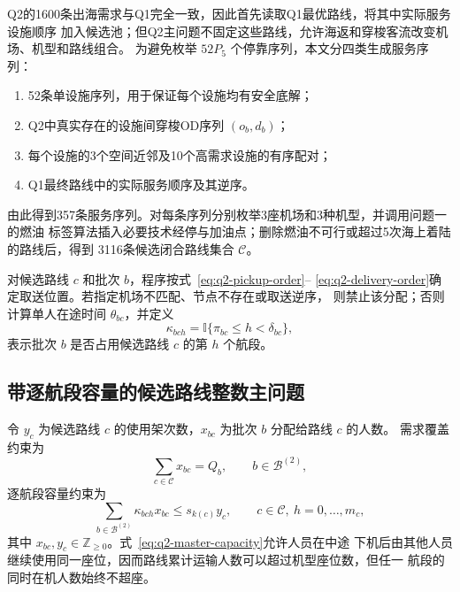 \documentclass[UTF8,a4paper,zihao=5]{ctexart}
\begin{document}
Q2的1600条出海需求与Q1完全一致，因此首先读取Q1最优路线，将其中实际服务设施顺序
加入候选池；但Q2主问题不固定这些路线，允许海返和穿梭客流改变机场、机型和路线组合。
为避免枚举 $52P_5$ 个停靠序列，本文分四类生成服务序列：
\begin{enumerate}[label=\arabic*.]
  \item 52条单设施序列，用于保证每个设施均有安全底解；
  \item Q2中真实存在的设施间穿梭OD序列 $(o_b,d_b)$；
  \item 每个设施的3个空间近邻及10个高需求设施的有序配对；
  \item Q1最终路线中的实际服务顺序及其逆序。
\end{enumerate}
由此得到357条服务序列。对每条序列分别枚举3座机场和3种机型，并调用问题一的燃油
标签算法插入必要技术经停与加油点；删除燃油不可行或超过5次海上着陆的路线后，得到
3116条候选闭合路线集合 $\mathcal C$。

对候选路线 $c$ 和批次 $b$，程序按式~\eqref{eq:q2-pickup-order}--
\eqref{eq:q2-delivery-order}确定取送位置。若指定机场不匹配、节点不存在或取送逆序，
则禁止该分配；否则计算单人在途时间 $\theta_{bc}$，并定义
\begin{equation}
  \kappa_{bch}=\mathbb I\{\pi_{bc}\le h<\delta_{bc}\},
  \label{eq:q2-onboard-indicator}
\end{equation}
表示批次 $b$ 是否占用候选路线 $c$ 的第 $h$ 个航段。

\subsection{带逐航段容量的候选路线整数主问题}

令 $y_c$ 为候选路线 $c$ 的使用架次数，$x_{bc}$ 为批次 $b$ 分配给路线 $c$ 的人数。
需求覆盖约束为
\begin{equation}
  \sum_{c\in\mathcal C}x_{bc}=Q_b,
  \qquad b\in\mathcal B^{(2)},
  \label{eq:q2-master-cover}
\end{equation}
逐航段容量约束为
\begin{equation}
  \sum_{b\in\mathcal B^{(2)}}\kappa_{bch}x_{bc}
  \le s_{k(c)}y_c,
  \qquad c\in\mathcal C,\ h=0,\ldots,m_c,
  \label{eq:q2-master-capacity}
\end{equation}
其中 $x_{bc},y_c\in\mathbb Z_{\ge0}$。式~\eqref{eq:q2-master-capacity}允许人员在中途
下机后由其他人员继续使用同一座位，因而路线累计运输人数可以超过机型座位数，但任一
航段的同时在机人数始终不超座。
\end{document}
